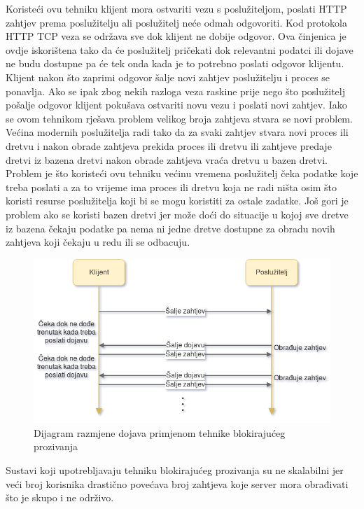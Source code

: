 \documentclass[times, utf8, zavrsni]{fer}
\begin{document}
Koristeći ovu tehniku klijent mora ostvariti vezu s poslužiteljom, poslati HTTP zahtjev prema poslužitelju ali poslužitelj neće odmah odgovoriti. Kod protokola HTTP TCP veza se održava sve dok klijent ne dobije odgovor. Ova činjenica je ovdje iskorištena tako da će poslužitelj pričekati dok relevantni podatci ili dojave ne budu dostupne pa će tek onda kada je to potrebno poslati odgovor klijentu. Klijent nakon što zaprimi odgovor šalje novi zahtjev poslužitelju i proces se ponavlja. Ako se ipak zbog nekih razloga veza raskine prije nego što poslužitelj pošalje odgovor klijent pokušava ostvariti novu vezu i poslati novi zahtjev. Iako se ovom tehnikom rješava problem velikog broja zahtjeva stvara se novi problem. Većina modernih poslužitelja radi tako da za svaki zahtjev stvara novi proces ili dretvu i nakon obrade zahtjeva prekida proces ili dretvu ili zahtjeve predaje dretvi iz bazena dretvi nakon obrade zahtjeva  vraća dretvu u bazen dretvi. Problem je što koristeći ovu tehniku većinu vremena poslužitelj čeka podatke koje treba poslati a za to vrijeme ima proces ili dretvu koja ne radi ništa osim što koristi resurse poslužitelja koji bi se mogu koristiti za ostale zadatke. Još gori je problem ako se koristi bazen dretvi jer može doći do situacije u kojoj sve dretve iz bazena čekaju podatke pa nema ni jedne dretve dostupne za obradu novih zahtjeva koji čekaju u redu ili se odbacuju.

\begin{figure}[htb]
\centering
\includegraphics[width=\linewidth]{img/long-polling.png}
\caption{Dijagram razmjene dojava primjenom tehnike blokirajućeg prozivanja}
\label{fig:long-polling-image}
\end{figure}

Sustavi koji upotrebljavaju tehniku blokirajućeg prozivanja su ne skalabilni jer veći broj korisnika drastično povećava broj zahtjeva koje server mora obrađivati što je skupo i ne održivo. 
\end{document}
